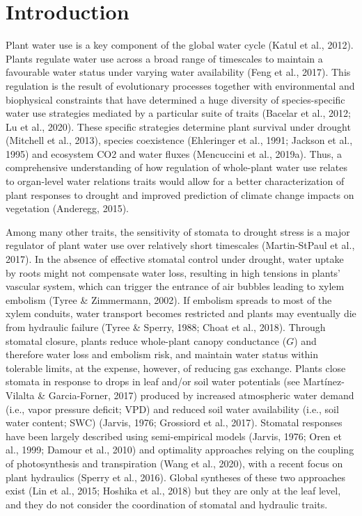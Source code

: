 \documentclass[11pt,twoside]{reedthesis}
\begin{document}
\section{Introduction}\label{introduction}

Plant water use is a key component of the global water cycle (Katul et
al., 2012). Plants regulate water use across a broad range of timescales
to maintain a favourable water status under varying water availability
(Feng et al., 2017). This regulation is the result of evolutionary
processes together with environmental and biophysical constraints that
have determined a huge diversity of species-specific water use
strategies mediated by a particular suite of traits (Bacelar et al.,
2012; Lu et al., 2020). These specific strategies determine plant
survival under drought (Mitchell et al., 2013), species coexistence
(Ehleringer et al., 1991; Jackson et al., 1995) and ecosystem CO2 and
water fluxes (Mencuccini et al., 2019a). Thus, a comprehensive
understanding of how regulation of whole-plant water use relates to
organ-level water relations traits would allow for a better
characterization of plant responses to drought and improved prediction
of climate change impacts on vegetation (Anderegg, 2015).\par

Among many other traits, the sensitivity of stomata to drought stress is
a major regulator of plant water use over relatively short timescales
(Martin-StPaul et al., 2017). In the absence of effective stomatal
control under drought, water uptake by roots might not compensate water
loss, resulting in high tensions in plants' vascular system, which can
trigger the entrance of air bubbles leading to xylem embolism (Tyree \&
Zimmermann, 2002). If embolism spreads to most of the xylem conduits,
water transport becomes restricted and plants may eventually die from
hydraulic failure (Tyree \& Sperry, 1988; Choat et al., 2018). Through
stomatal closure, plants reduce whole-plant canopy conductance (\(G\))
and therefore water loss and embolism risk, and maintain water status
within tolerable limits, at the expense, however, of reducing gas
exchange. Plants close stomata in response to drops in leaf and/or soil
water potentials (see Martínez-Vilalta \& Garcia-Forner, 2017) produced
by increased atmospheric water demand (i.e., vapor pressure deficit;
VPD) and reduced soil water availability (i.e., soil water content; SWC)
(Jarvis, 1976; Grossiord et al., 2017). Stomatal responses have been
largely described using semi-empirical models (Jarvis, 1976; Oren et
al., 1999; Damour et al., 2010) and optimality approaches relying on the
coupling of photosynthesis and transpiration (Wang et al., 2020), with a
recent focus on plant hydraulics (Sperry et al., 2016). Global syntheses
of these two approaches exist (Lin et al., 2015; Hoshika et al., 2018)
but they are only at the leaf level, and they do not consider the
coordination of stomatal and hydraulic traits.\par 
\end{document}
